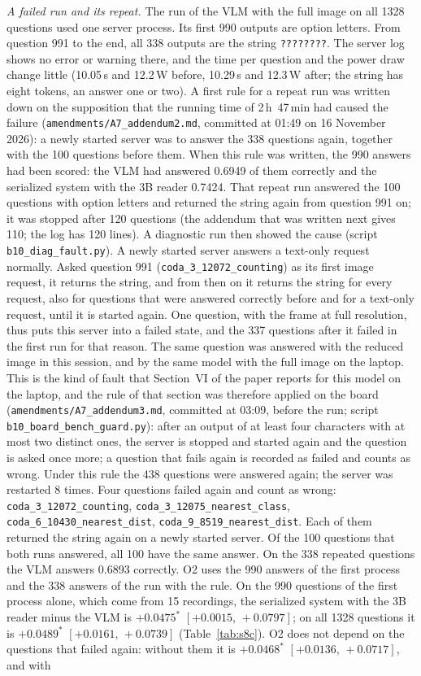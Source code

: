 \documentclass[10pt]{article}
\begin{document}
\emph{A failed run and its repeat.} The run of the VLM with the full image on all 1328 questions used one server process. Its first 990 outputs are option letters. From question 991 to the end, all 338 outputs are the string \texttt{????????}. The server log shows no error or warning there, and the time per question and the power draw change little (10.05\,s and 12.2\,W before, 10.29\,s and 12.3\,W after; the string has eight tokens, an answer one or two). A first rule for a repeat run was written down on the supposition that the running time of 2\,h~47\,min had caused the failure (\texttt{amendments/A7\_addendum2.md}, committed at 01:49 on 16 November 2026): a newly started server was to answer the 338 questions again, together with the 100 questions before them. When this rule was written, the 990 answers had been scored: the VLM had answered 0.6949 of them correctly and the serialized system with the 3B reader 0.7424. That repeat run answered the 100 questions with option letters and returned the string again from question 991 on; it was stopped after 120 questions (the addendum that was written next gives 110; the log has 120 lines). A diagnostic run then showed the cause (script \texttt{b10\_diag\_fault.py}). A newly started server answers a text-only request normally. Asked question 991 (\texttt{coda\_3\_12072\_counting}) as its first image request, it returns the string, and from then on it returns the string for every request, also for questions that were answered correctly before and for a text-only request, until it is started again. One question, with the frame at full resolution, thus puts this server into a failed state, and the 337 questions after it failed in the first run for that reason. The same question was answered with the reduced image in this session, and by the same model with the full image on the laptop. This is the kind of fault that Section~VI of the paper reports for this model on the laptop, and the rule of that section was therefore applied on the board (\texttt{amendments/A7\_addendum3.md}, committed at 03:09, before the run; script \texttt{b10\_board\_bench\_guard.py}): after an output of at least four characters with at most two distinct ones, the server is stopped and started again and the question is asked once more; a question that fails again is recorded as failed and counts as wrong. Under this rule the 438 questions were answered again; the server was restarted 8 times. Four questions failed again and count as wrong: \texttt{coda\_3\_12072\_counting}, \texttt{coda\_3\_12075\_nearest\_class}, \texttt{coda\_6\_10430\_nearest\_dist}, \texttt{coda\_9\_8519\_nearest\_dist}. Each of them returned the string again on a newly started server. Of the 100 questions that both runs answered, all 100 have the same answer. On the 338 repeated questions the VLM answers 0.6893 correctly. O2 uses the 990 answers of the first process and the 338 answers of the run with the rule. On the 990 questions of the first process alone, which come from 15 recordings, the serialized system with the 3B reader minus the VLM is $+0.0475^{*}$ $[+0.0015,\,+0.0797]$; on all 1328 questions it is $+0.0489^{*}$ $[+0.0161,\,+0.0739]$ (Table~\ref{tab:s8c}). O2 does not depend on the questions that failed again: without them it is $+0.0468^{*}$ $[+0.0136,\,+0.0717]$, and with 
\end{document}
